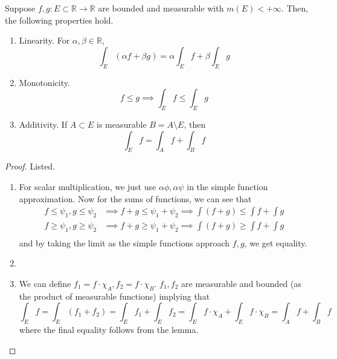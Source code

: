   \begin{theorem}
    Suppose $f, g: E \subset \mathbb{R} \to \mathbb{R}$ are bounded and measurable with $m(E) < +\infty$. Then, the following properties hold. 
    \begin{enumerate}
      \item Linearity. For $\alpha, \beta \in \mathbb{R}$, 
        \begin{equation}
          \int_E (\alpha f + \beta g) = \alpha \int_E f + \beta \int_E g
        \end{equation} 

      \item Monotonicity. 
        \begin{equation}
          f \leq g \implies \int_E f \leq \int_E g
        \end{equation}

      \item Additivity. If $A \subset E$ is measurable $B = A \setminus E$, then 
        \begin{equation}
          \int_E f  = \int_A f + \int_B f
        \end{equation}
    \end{enumerate}
  \end{theorem}
  \begin{proof} 
    Listed. 
    \begin{enumerate}
      \item For scalar multiplication, we just use $\alpha \phi, \alpha \psi$ in the simple function approximation. Now for the sums of functions, we can see that 
        \begin{align}
          f \leq \psi_1, g \leq \psi_2 & \implies f + g \leq \psi_1 + \psi_2 \implies \int (f + g) \leq \int f + \int g \\ 
          f \geq \psi_1, g \geq \psi_2 & \implies f + g \geq \psi_1 + \psi_2 \implies \int (f + g) \geq \int f + \int g \\ 
        \end{align} 
        and by taking the limit as the simple functions approach $f, g$, we get equality. 
      \item 
      \item We can define $f_1 = f \cdot \chi_A, f_2 = f \cdot \chi_B$. $f_1, f_2$ are measurable and bounded (as the product of measurable functions) implying that 
        \begin{equation}
          \int_E f = \int_E (f_1 + f_2) = \int_E f_1 + \int_E f_2 = \int_E f \cdot \chi_A + \int_E f \cdot \chi_B = \int_A f + \int_B f
        \end{equation}
        where the final equality follows from the lemma. 
    \end{enumerate}
  \end{proof} 

